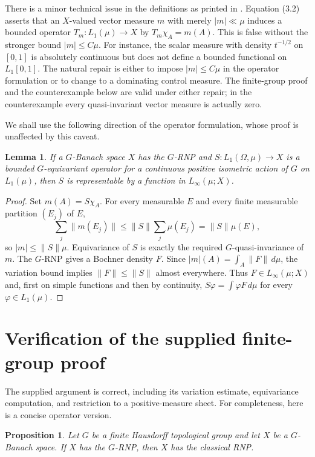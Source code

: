 \documentclass[11pt]{article}
\newtheorem{proposition}[theorem]{Proposition}
\newtheorem{lemma}[theorem]{Lemma}
\theoremstyle{remark}
\begin{document}
There is a minor technical issue in the definitions as printed in
\cite{DDJR}.  Equation (3.2) asserts that an $X$-valued vector measure $m$
with merely $|m|\ll\mu$ induces a bounded operator
$T_m:L_1(\mu)\to X$ by $T_m\chi_A=m(A)$.  This is false without the stronger
bound $|m|\leq C\mu$.  For instance, the scalar measure with density
$t^{-1/2}$ on $[0,1]$ is absolutely continuous but does not define a bounded
functional on $L_1[0,1]$.  The natural repair is either to impose
$|m|\leq C\mu$ in the operator formulation or to change to a dominating
control measure.  The finite-group proof and the counterexample below are
valid under either repair; in the counterexample every quasi-invariant
vector measure is actually zero.

We shall use the following direction of the operator formulation, whose proof
is unaffected by this caveat.

\begin{lemma}\label{lem:operator-direction}
If a $G$-Banach space $X$ has the $G$-RNP and
$S:L_1(\Omega,\mu)\to X$ is a bounded $G$-equivariant operator for a
continuous positive isometric action of $G$ on $L_1(\mu)$, then $S$ is
representable by a function in $L_\infty(\mu;X)$.
\end{lemma}

\begin{proof}
Set $m(A)=S\chi_A$.  For every measurable $E$ and every finite measurable
partition $(E_j)$ of $E$,
\[
  \sum_j\|m(E_j)\|
  \leq \|S\|\sum_j\mu(E_j)=\|S\|\mu(E),
\]
so $|m|\leq\|S\|\mu$.  Equivariance of $S$ is exactly the required
$G$-quasi-invariance of $m$.  The $G$-RNP gives a Bochner density $F$.
Since $|m|(A)=\int_A\|F\|\,d\mu$, the variation bound implies
$\|F\|\leq\|S\|$ almost everywhere.  Thus $F\in L_\infty(\mu;X)$ and,
first on simple functions and then by continuity,
$S\varphi=\int\varphi F\,d\mu$ for every $\varphi\in L_1(\mu)$.
\end{proof}

\section{Verification of the supplied finite-group proof}

The supplied argument is correct, including its variation estimate,
equivariance computation, and restriction to a positive-measure sheet.  For
completeness, here is a concise operator version.

\begin{proposition}\label{prop:finite}
Let $G$ be a finite Hausdorff topological group and let $X$ be a
$G$-Banach space.  If $X$ has the $G$-RNP, then $X$ has the classical RNP.
\end{proposition}
\end{document}

